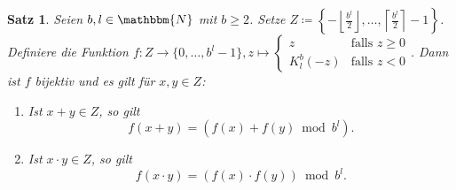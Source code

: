 \documentclass{article}
\newcommand{\N}{\mathbbm{N}} %
\newtheorem{satz}{Satz}
\begin{document}
  \begin{satz} \label{satz:Rechnen-Komplementdarstellung}
    Seien $b,l \in \N$ mit $b \geq 2$. Setze $Z \coloneq \left\{ - \left\lfloor \displaystyle\frac{b^l}{2} \right\rfloor , \dots, \left\lceil \displaystyle\frac{b^l}{2} \right\rceil -1 \right\}$.
    Definiere die Funktion $f \colon Z \to \{0, \dots, b^l-1\}, z \mapsto 
      \begin{cases}
        z &\text{falls } z \geq 0 \\
        K_l^b(-z) &\text{falls } z <0
      \end{cases}$.
    Dann ist $f$ bijektiv und es gilt für $x,y\in Z$:
    \begin{enumerate}[label=(\roman*)] 
      \item Ist $x+y \in Z$, so gilt 
        \[f(x+y) = (f(x) + f(y) \bmod b^l).\] \label{satz:Rechnen-Komplementdarstellung_Addition}
      \item Ist $x \cdot y \in Z$, so gilt 
        \[f(x \cdot y) = (f(x) \cdot f(y)) \bmod b^l.\] \label{satz:Rechnen-Komplementdarstellung_Multiplikation}
    \end{enumerate}
  \end{satz}
\end{document}
